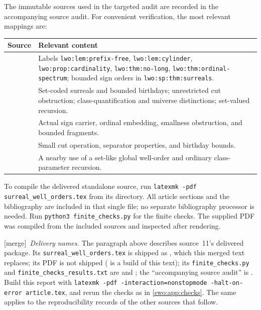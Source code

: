 \documentclass[11pt]{article}
\theoremstyle{definition}
\theoremstyle{remark}
\newcommand{\code}[1]{\texttt{\small #1}}
\newcommand{\merge}{\textsf{[merge]}}
\begin{document}
The immutable sources used in the targeted audit are
recorded in the accompanying source audit. For convenient
verification, the most relevant mappings are:

\begin{longtable}{@{}>{\raggedright\arraybackslash}p{}>{\raggedright\arraybackslash}p{}@{}}
\toprule
Source & Relevant content\\
\midrule
\endhead
\cite{ProveItReals} &
Labels \code{lwo:lem:prefix-free},
\code{lwo:lem:cylinder}, \code{lwo:prop:cardinality},
\code{lwo:thm:no-long},
\code{lwo:thm:ordinal-spectrum}; bounded sign orders in
\code{lwo:sp:thm:surreals}.\\[4pt]
\cite{ProveItFoundations} &
Set-coded surreals and bounded birthdays; unrestricted
cut obstruction; class-quantification and universe
distinctions; set-valued recursion.\\[4pt]
\cite{ProveItSigns} &
Actual sign carrier, ordinal embedding, smallness
obstruction, and bounded fragments.\\[4pt]
\cite{ProveItCuts} &
Small cut operation, separator properties, and
birthday bounds.\\[4pt]
\cite{ProveItVector} &
A nearby use of a set-like global well-order and
ordinary class-parameter recursion.\\
\bottomrule
\end{longtable}

To compile the delivered standalone source, run
\code{latexmk -pdf surreal\_well\_orders.tex} from its directory.
All article sections and the bibliography are included in that
single file; no separate bibliography processor is needed.
Run \code{python3 finite\_checks.py} for the finite checks.
The supplied PDF was compiled from the included sources
and inspected after rendering.


\merge\ \emph{Delivery names.} The paragraph above describes source~11's
delivered package. Its \code{surreal\_well\_orders.tex} is shipped as
, which this merged text replaces; its PDF is not shipped
( is a build of this text); its \code{finite\_checks.py} and
\code{finite\_checks\_results.txt} are
 and
; the ``accompanying source
audit'' is . Build this report with
\code{latexmk -pdf -interaction=nonstopmode -halt-on-error article.tex}, and
rerun the checks as in \cref{swo:app:checks}. The same applies to the
reproducibility records of the other sources that follow.
\end{document}
